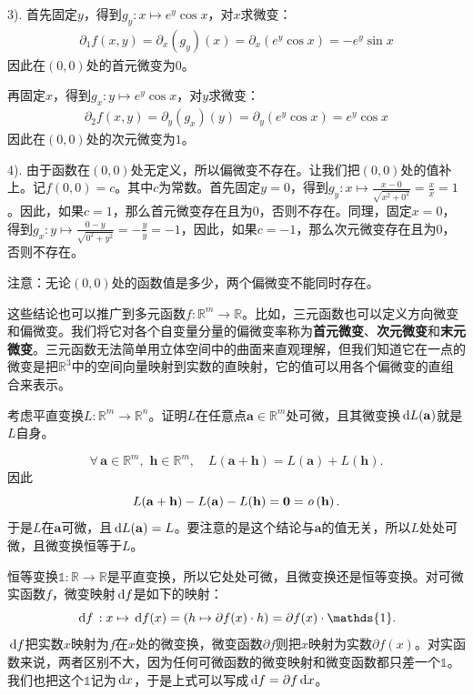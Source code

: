 \documentclass[12pt,UTF8]{ctexbook}
\begin{document}
\begin{so}
    3). 首先固定$y$，得到$g_y: x\mapsto e^y\cos{x} $，对$x$求微变：
    \begin{align*}
        \partial_{1} f (x, y) = \partial_x (g_y) (x) = \partial_x \left( e^y\cos{x} \right) = -e^y\sin{x}
    \end{align*}
    因此在$(0,0)$处的首元微变为$0$。

    再固定$x$，得到$g_x: y\mapsto e^y\cos{x} $，对$y$求微变：
    \begin{align*}
        \partial_{2} f (x, y) = \partial_y (g_x) (y)  = \partial_y \left( e^y\cos{x} \right) = e^y\cos{x}
    \end{align*}
    因此在$(0,0)$处的次元微变为$1$。
    
    4). 由于函数在$(0,0)$处无定义，所以偏微变不存在。让我们把$(0,0)$处的值补上。记$f(0,0)=c$。其中$c$为常数。首先固定$y=0$，得到$g_y: x\mapsto \displaystyle\frac{x - 0}{\sqrt{x^2 + 0^2}} = \frac{x}{x} = 1 $。因此，如果$c=1$，那么首元微变存在且为$0$，否则不存在。同理，固定$x=0$，得到$g_x: y\mapsto \displaystyle\frac{0 - y}{\sqrt{0^2 + y^2}} = -\frac{y}{y} = -1$，因此，如果$c=-1$，那么次元微变存在且为$0$，否则不存在。

    注意：无论$(0,0)$处的函数值是多少，两个偏微变不能同时存在。
\end{so}

这些结论也可以推广到多元函数$f: \mathbb{R}^m\rightarrow \mathbb{R}$。比如，三元函数也可以定义方向微变和偏微变。我们将它对各个自变量分量的偏微变率称为\textbf{首元微变}、\textbf{次元微变}和\textbf{末元微变}。三元函数无法简单用立体空间中的曲面来直观理解，但我们知道它在一点的微变是把$\mathbb{R}^3$中的空间向量映射到实数的直映射，它的值可以用各个偏微变的直组合来表示。

\begin{et}
    考虑平直变换$L:\mathbb{R}^m\rightarrow\mathbb{R}^n$。证明$L$在任意点$\mathbf{a}\in\mathbb{R}^m$处可微，且其微变换$\,\mathrm{d} L(\mathbf{a})$就是$L$自身。
\end{et}

\begin{so}
    $$\forall\, \mathbf{a}\in\mathbb{R}^m,\,\,\mathbf{h}\in\mathbb{R}^m , \quad L(\mathbf{a}+\mathbf{h}) = L(\mathbf{a}) + L(\mathbf{h}). $$
    因此
    $$ L(\mathbf{a}+\mathbf{h}) - L(\mathbf{a}) - L(\mathbf{h}) = \mathbf{0} = \mathit{o}\left(\mathbf{h}\right). $$
    于是$L$在$\mathbf{a}$可微，且$\,\mathrm{d} L(\mathbf{a})=L$。要注意的是这个结论与$\mathbf{a}$的值无关，所以$L$处处可微，且微变换恒等于$L$。
\end{so}

恒等变换$\mathds{1}:\mathbb{R}\to\mathbb{R}$是平直变换，所以它处处可微，且微变换还是恒等变换。对可微实函数$f$，微变映射$\,\mathrm{d} f$是如下的映射：
$$ \diff f \,: x \mapsto \diff f(x) = (h\mapsto \partial f(x) \cdot h) = \partial f(x)\cdot \mathds{1}. $$
$\,\mathrm{d} f$把实数$x$映射为$f$在$x$处的微变换，微变函数$\partial f$则把$x$映射为实数$\partial f(x)$。对实函数来说，两者区别不大，因为任何可微函数的微变映射和微变函数都只差一个$\mathds{1}$。我们也把这个$\mathds{1}$记为$\,\mathrm{d}x$，于是上式可以写成$\,\mathrm{d} f = \partial f \,\mathrm{d}x$。
\end{document}

